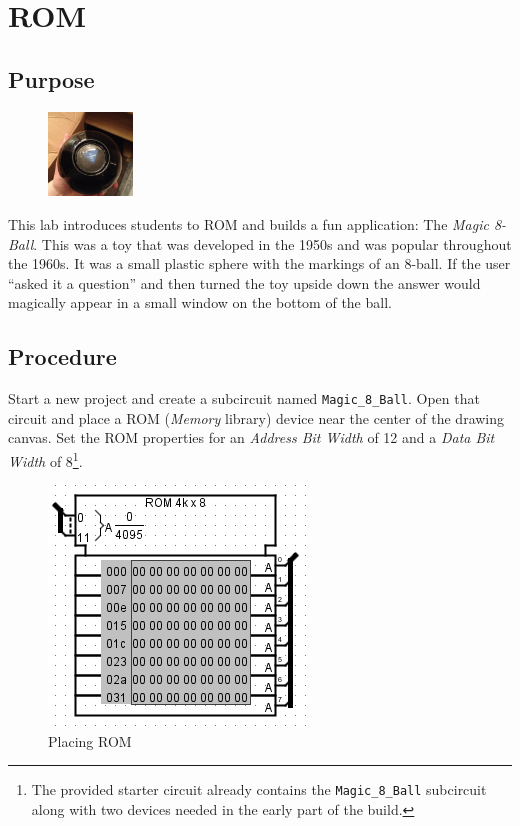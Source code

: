 \chapter{ROM}\label{rom}

\section{Purpose}

\begin{figure}
	\caption*{} %
	\label{fig:rom-01} 
	\centering
	\includegraphics[width=0.2\textwidth]{gfx/rom-01} 
\end{figure}
This lab introduces students to \acf{ROM} and builds a fun application: The \textit{Magic 8-Ball}. This was a toy that was developed in the 1950s and was popular throughout the 1960s. It was a small plastic sphere with the markings of an 8-ball. If the user ``asked it a question'' and then turned the toy upside down the answer would magically appear in a small window on the bottom of the ball.

\section{Procedure}

Start a new \LE project and create a subcircuit named \lstinline[columns=fixed]|Magic_8_Ball|. Open that circuit and place a ROM (\textit{Memory} library) device near the center of the drawing canvas. Set the ROM properties for an \textit{Address Bit Width} of 12 and a \textit{Data Bit Width} of 8\footnote{The provided starter circuit already contains the \lstinline[columns=fixed]|Magic_8_Ball| subcircuit along with two devices needed in the early part of the build.}.

\begin{figure}[H]
	\centering
	\includegraphics[width=\maxwidth{.95\linewidth}]{gfx/rom-02}
	\caption{Placing ROM}
	\label{fig:rom-02}
\end{figure}

